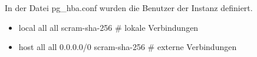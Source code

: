 	In der Datei \textsf{pg\_hba.conf} wurden die Benutzer der Instanz definiert.
	\begin{itemize}
		\item \textsf{local   all     all                      scram-sha-256} \# lokale Verbindungen
		\item \textsf{host    all             all              0.0.0.0/0         scram-sha-256} \# externe Verbindungen
	\end{itemize}
